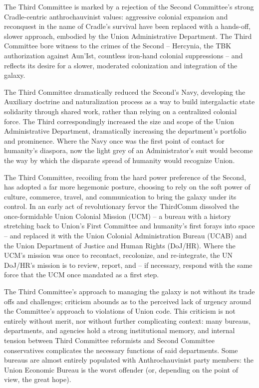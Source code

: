 The Third Committee is marked by a rejection of the Second Committee’s strong Cradle-centric
anthrochauvinist values: aggressive colonial expansion and reconquest in the name of Cradle’s
survival have been replaced with a hands-off, slower approach, embodied by the Union
Administrative Department. The Third Committee bore witness to the crimes of the Second --
Hercynia, the TBK authorization against Aun’Ist, countless iron-hand colonial suppressions -- and
reflects its desire for a slower, moderated colonization and integration of the galaxy.

The Third Committee dramatically reduced the Second’s Navy, developing the Auxiliary doctrine
and naturalization process as a way to build intergalactic state solidarity through shared work,
rather than relying on a centralized colonial force. The Third correspondingly increased the size
and scope of the Union Administrative Department, dramatically increasing the department’s
portfolio and prominence. Where the Navy once was the first point of contact for humanity’s
diaspora, now the light grey of an Administrator’s suit would become the way by which the
disparate spread of humanity would recognize Union.

The Third Committee, recoiling from the hard power preference of the Second, has adopted a far
more hegemonic posture, choosing to rely on the soft power of culture, commerce, travel, and
communication to bring the galaxy under its control. In an early act of revolutionary fervor the
ThirdComm dissolved the once-formidable Union Colonial Mission (UCM) -- a bureau with a
history stretching back to Union’s First Committee and humanity’s first forays into space -- and
replaced it with the Union Colonial Administration Bureau (UCAB) and the Union Department of
Justice and Human Rights (DoJ/HR). Where the UCM’s mission was once to recontact,
recolonize, and re-integrate, the UN DoJ/HR’s mission is to review, report, and -- if necessary,
respond with the same force that the UCM once mandated as a first step.

The Third Committee’s approach to managing the galaxy is not without its trade offs and
challenges; criticism abounds as to the perceived lack of urgency around the Committee’s
approach to violations of Union code. This criticism is not entirely without merit, nor without further
complicating context: many bureaus, departments, and agencies hold a strong institutional
memory, and internal tension between Third Committee reformists and Second Committee
conservatives complicates the necessary functions of said departments. Some bureaus are
almost entirely populated with Anthrochauvinist party members: the Union Economic Bureau is
the worst offender (or, depending on the point of view, the great hope).

